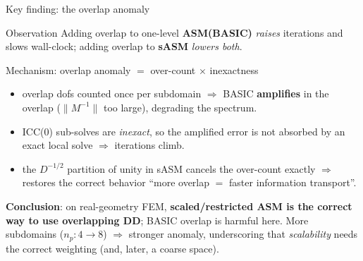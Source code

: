 \documentclass[aspectratio=169,11pt]{beamer}
\begin{document}
\begin{frame}{Key finding: the overlap anomaly}
\begin{block}{Observation}
Adding overlap to one-level \textbf{ASM(BASIC)} \emph{raises} iterations and slows wall-clock; adding overlap to \textbf{sASM} \emph{lowers both}.
\end{block}
\begin{block}{Mechanism: overlap anomaly $=$ over-count $\times$ inexactness}
\begin{itemize}
\item overlap dofs counted once per subdomain $\Rightarrow$ BASIC \textbf{amplifies} in the overlap ($\|M^{-1}\|$ too large), degrading the spectrum.
\item ICC(0) sub-solves are \emph{inexact}, so the amplified error is not absorbed by an exact local solve $\Rightarrow$ iterations climb.
\item the $D^{-1/2}$ partition of unity in sASM cancels the over-count exactly $\Rightarrow$ restores the correct behavior ``more overlap $=$ faster information transport''.
\end{itemize}
\end{block}
\textbf{Conclusion}: on real-geometry FEM, \textbf{scaled/restricted ASM is the correct way to use overlapping DD}; BASIC overlap is harmful here. More subdomains ($n_p{:}4{\to}8$) $\Rightarrow$ stronger anomaly, underscoring that \emph{scalability} needs the correct weighting (and, later, a coarse space).
\end{frame}
\end{document}
